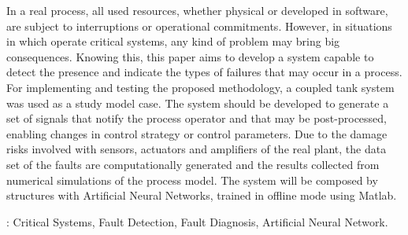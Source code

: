 In a real process, all used resources, whether physical or developed in
software, are subject to interruptions or operational commitments. However, in
situations in which operate critical systems, any kind of problem may bring big
consequences. Knowing this, this paper aims to develop a system capable to
detect the presence and indicate the types of failures that may occur in a
process. For implementing and testing the proposed methodology, a
coupled tank system was used as a study model case. The system should be
developed to generate a set of signals that notify the process operator and that
may be post-processed, enabling changes in control strategy or control
parameters. Due to the damage risks involved with sensors, actuators and
amplifiers of the real plant, the data set of the faults are computationally
generated and the results collected from numerical simulations of the process
model. The system will be composed by structures with Artificial Neural
Networks, trained in offline mode using Matlab\reg.

\vspace{1.5ex}

: Critical Systems, Fault Detection, Fault Diagnosis,
Artificial Neural Network.
